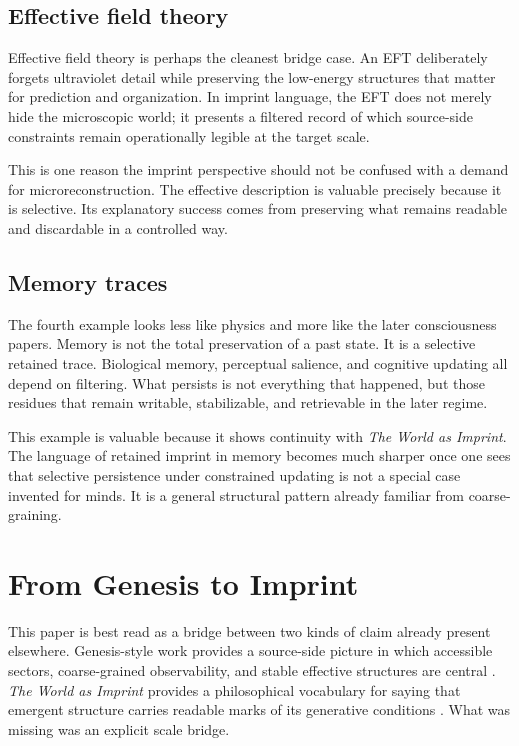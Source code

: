 \documentclass[12pt]{article}
\begin{document}
\subsection{Effective field theory}

Effective field theory is perhaps the cleanest bridge case. An EFT deliberately forgets ultraviolet detail while preserving the low-energy structures that matter for prediction and organization. In imprint language, the EFT does not merely hide the microscopic world; it presents a filtered record of which source-side constraints remain operationally legible at the target scale.

This is one reason the imprint perspective should not be confused with a demand for microreconstruction. The effective description is valuable precisely because it is selective. Its explanatory success comes from preserving what remains readable and discardable in a controlled way.

\subsection{Memory traces}

The fourth example looks less like physics and more like the later consciousness papers. Memory is not the total preservation of a past state. It is a selective retained trace. Biological memory, perceptual salience, and cognitive updating all depend on filtering. What persists is not everything that happened, but those residues that remain writable, stabilizable, and retrievable in the later regime.

This example is valuable because it shows continuity with \emph{The World as Imprint}. The language of retained imprint in memory becomes much sharper once one sees that selective persistence under constrained updating is not a special case invented for minds. It is a general structural pattern already familiar from coarse-graining.

\section{From Genesis to Imprint}

This paper is best read as a bridge between two kinds of claim already present elsewhere. Genesis-style work provides a source-side picture in which accessible sectors, coarse-grained observability, and stable effective structures are central \cite{HAFFA,HAFFD,FoundationI}. \emph{The World as Imprint} provides a philosophical vocabulary for saying that emergent structure carries readable marks of its generative conditions \cite{WorldImprint}. What was missing was an explicit scale bridge.
\end{document}
